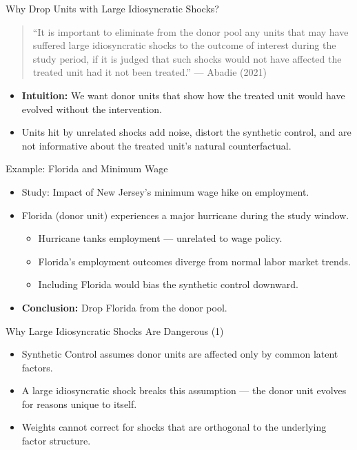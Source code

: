 \documentclass{beamer}
\begin{document}
\begin{frame}{Why Drop Units with Large Idiosyncratic Shocks?}
  \begin{quote}
    ``It is important to eliminate from the donor pool any units that may have suffered large idiosyncratic shocks to the outcome of interest during the study period, if it is judged that such shocks would not have affected the treated unit had it not been treated.'' — Abadie (2021)
  \end{quote}
  \vspace{0.5cm}
  \begin{itemize}
    \item \textbf{Intuition:} We want donor units that show how the treated unit would have evolved without the intervention.
    \item Units hit by unrelated shocks add noise, distort the synthetic control, and are not informative about the treated unit’s natural counterfactual.
  \end{itemize}
\end{frame}

\begin{frame}{Example: Florida and Minimum Wage}
  \begin{itemize}
    \item Study: Impact of New Jersey's minimum wage hike on employment.
    \item Florida (donor unit) experiences a major hurricane during the study window.
    \begin{itemize}
      \item Hurricane tanks employment — unrelated to wage policy.
      \item Florida's employment outcomes diverge from normal labor market trends.
      \item Including Florida would bias the synthetic control downward.
    \end{itemize}
    \item \textbf{Conclusion:} Drop Florida from the donor pool.
  \end{itemize}
\end{frame}

\begin{frame}{Why Large Idiosyncratic Shocks Are Dangerous (1)}
  \begin{itemize}
    \item Synthetic Control assumes donor units are affected only by common latent factors.
    \item A large idiosyncratic shock breaks this assumption — the donor unit evolves for reasons unique to itself.
    \item Weights cannot correct for shocks that are orthogonal to the underlying factor structure.
  \end{itemize}
\end{frame}
\end{document}
